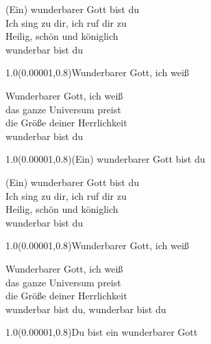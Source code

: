 \documentclass[aspectratio=169]{beamer}
\begin{document}
\begin{frame}
\centering
\color{white}
\huge{(Ein) wunderbarer Gott bist du} \\
\huge{Ich sing zu dir, ich ruf dir zu} \\
\huge{Heilig, schön und königlich} \\
\huge{wunderbar bist du} \\

\begin{textblock}{1.0}(0.00001,0.8)\color{gray}\normalsize{Wunderbarer Gott, ich weiß}\end{textblock}
\end{frame}

\begin{frame}
\centering
\color{white}
\huge{Wunderbarer Gott, ich weiß} \\
\huge{das ganze Universum preist} \\
\huge{die Größe deiner Herrlichkeit} \\
\huge{wunderbar bist du} \\

\begin{textblock}{1.0}(0.00001,0.8)\color{gray}\normalsize{(Ein) wunderbarer Gott bist du}\end{textblock}
\end{frame}

\begin{frame}
\centering
\color{white}
\huge{(Ein) wunderbarer Gott bist du} \\
\huge{Ich sing zu dir, ich ruf dir zu} \\
\huge{Heilig, schön und königlich} \\
\huge{wunderbar bist du} \\

\begin{textblock}{1.0}(0.00001,0.8)\color{gray}\normalsize{Wunderbarer Gott, ich weiß}\end{textblock}
\end{frame}

\begin{frame}
\centering
\color{white}
\huge{Wunderbarer Gott, ich weiß} \\
\huge{das ganze Universum preist} \\
\huge{die Größe deiner Herrlichkeit} \\
\huge{wunderbar bist du, wunderbar bist du} \\

\begin{textblock}{1.0}(0.00001,0.8)\color{gray}\normalsize{Du bist ein wunderbarer Gott}\end{textblock}
\end{frame}
\end{document}

